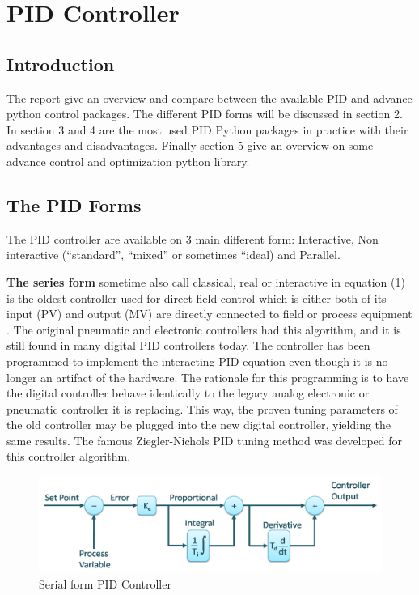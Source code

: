 \section{PID Controller}

\subsection{Introduction}

The report give an overview and compare between the available PID and advance python control packages. The different PID forms will be discussed in section 2. In section 3 and 4 are the most used PID Python packages in practice with their advantages and disadvantages. Finally section 5 give an overview on some advance control and optimization python library.

\subsection{The PID Forms}

The PID controller are available on 3 main different form: Interactive, Non interactive (“standard”, “mixed” or sometimes “ideal) and Parallel.  

\textbf{The series form} sometime also call classical, real or interactive in equation (1) is the oldest controller used for direct field control which is either both of its input (PV) and output (MV) are directly connected to field or process equipment \cite{Wolfgang}. The original pneumatic and electronic controllers had this algorithm, and it is still found in many digital PID controllers today. The controller has been programmed to implement the interacting PID equation even though it is no longer an artifact of the hardware. The rationale for this programming is to have the digital controller behave identically to the legacy analog electronic or pneumatic controller it is replacing. This way, the proven tuning parameters of the old controller may be plugged into the new digital controller, yielding the same results.  
The famous Ziegler-Nichols PID tuning method was developed for this controller algorithm. 

\begin{figure}[H]
	\centering
	\includegraphics[width=0.8\columnwidth]{Figures/series.png}
	\caption[Short title]{Serial form PID Controller \cite{PID}}
	\label{figure: Serial PID}
\end{figure}


